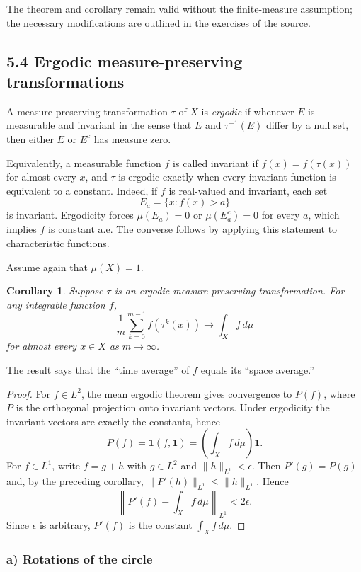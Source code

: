 \documentclass[11pt,openany]{book}
\newtheorem{corollary}[theorem]{Corollary}
\begin{document}
The theorem and corollary remain valid without the finite-measure assumption; the necessary modifications are outlined in the exercises of the source.

\subsection*{5.4 Ergodic measure-preserving transformations}

A measure-preserving transformation $\tau$ of $X$ is \emph{ergodic} if whenever $E$ is measurable and invariant in the sense that $E$ and $\tau^{-1}(E)$ differ by a null set, then either $E$ or $E^c$ has measure zero.

Equivalently, a measurable function $f$ is called invariant if $f(x)=f(\tau(x))$ for almost every $x$, and $\tau$ is ergodic exactly when every invariant function is equivalent to a constant. Indeed, if $f$ is real-valued and invariant, each set
\[
E_a=\{x:f(x)>a\}
\]
is invariant. Ergodicity forces $\mu(E_a)=0$ or $\mu(E_a^c)=0$ for every $a$, which implies $f$ is constant a.e. The converse follows by applying this statement to characteristic functions.

Assume again that $\mu(X)=1$.

\begin{corollary}
Suppose $\tau$ is an ergodic measure-preserving transformation. For any integrable function $f$,
\[
\frac1m\sum_{k=0}^{m-1}f(\tau^k(x))
\longrightarrow
\int_Xf\,d\mu
\]
for almost every $x\in X$ as $m\to\infty$.
\end{corollary}

The result says that the ``time average'' of $f$ equals its ``space average.''

\begin{proof}
For $f\in L^2$, the mean ergodic theorem gives convergence to $P(f)$, where $P$ is the orthogonal projection onto invariant vectors. Under ergodicity the invariant vectors are exactly the constants, hence
\[
P(f)=\mathbf1(f,\mathbf1)=\left(\int_Xf\,d\mu\right)\mathbf1.
\]
For $f\in L^1$, write $f=g+h$ with $g\in L^2$ and $\|h\|_{L^1}<\epsilon$. Then $P'(g)=P(g)$ and, by the preceding corollary, $\|P'(h)\|_{L^1}\leq\|h\|_{L^1}$. Hence
\[
\left\|P'(f)-\int_Xf\,d\mu\right\|_{L^1}<2\epsilon.
\]
Since $\epsilon$ is arbitrary, $P'(f)$ is the constant $\int_Xf\,d\mu$.
\end{proof}

\subsubsection*{a) Rotations of the circle}
\end{document}

